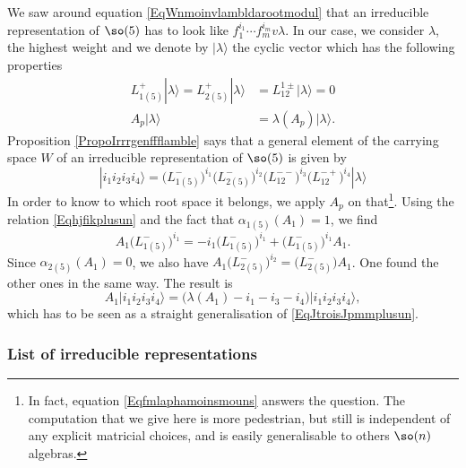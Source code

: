 We saw around equation \eqref{EqWnmoinvlambldarootmodul} that an irreducible representation of $\so(5)$ has to look like $f_1^{i_1}\cdots f_m^{i_m}v\lambda$. In our case, we consider $\lambda$, the highest weight and we denote by $| \lambda \rangle$ the cyclic vector which has the following properties
\begin{subequations}
	\begin{align}
		L^{+}_{1(5)}| \lambda \rangle=L^{+}_{2(5)}| \lambda \rangle&=L^{1\pm}_{12}| \lambda \rangle=0\\
		A_p| \lambda \rangle&=\lambda(A_p)| \lambda \rangle.
	\end{align}
\end{subequations}
Proposition \ref{PropoIrrrgenffflamble} says that a general element of the carrying space $W$ of an irreducible representation of $\so(5)$ is given by
\begin{equation}
	| i_1i_2i_3i_4 \rangle = \big( L^-_{1(5)} \big)^{i_1} \big( L_{2(5)}^- \big)^{i_2}\big( L^{--}_{12} \big)^{i_3}\big( L^{-+}_{12} \big)^{i_4}	| \lambda \rangle
\end{equation}
In order to know to which root space it belongs, we apply $A_p$ on that\footnote{In fact, equation \eqref{Eqfmlaphamoinsmouns} answers the question. The computation that we give here is more pedestrian, but still is independent of any explicit matricial choices, and is easily generalisable to others $\so(n)$ algebras.}. Using the relation \eqref{Eqhjfikplusun} and the fact that $\alpha_{1(5)}(A_1)=1$, we find
\begin{equation}
	A_1\big( L^-_{1(5)} \big)^{i_1}=-i_1\big( L^-_{1(5)} \big)^{i_1}+\big( L^-_{1(5)} \big)^{i_1}A_1.
\end{equation}
Since $\alpha_{2(5)}(A_1)=0$, we also have $A_1\big( L_{2(5)}^- \big)^{i_2}=\big( L_{2(5)}^- \big)A_1$. One found the other ones in the same way. The result is
\begin{equation}
	A_1| i_1i_2i_3i_4 \rangle=\big( \lambda(A_1)-i_1-i_3-i_4 \big)| i_1i_2i_3i_4 \rangle,
\end{equation}
which has to be seen as a straight generalisation of \eqref{EqJtroisJpmmplusun}.

\subsubsection{List of irreducible representations}

